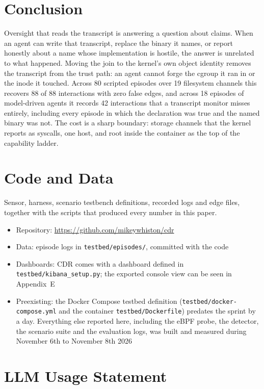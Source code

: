 \documentclass[11pt]{article}
\begin{document}
\section{Conclusion}

Oversight that reads the transcript is answering a question about claims. When an
agent can write that transcript, replace the binary it names, or report honestly
about a name whose implementation is hostile, the answer is unrelated to what
happened. Moving the join to the kernel's own object identity removes the transcript
from the trust path: an agent cannot forge the cgroup it ran in or the inode it
touched. Across 80 scripted episodes over 19 filesystem channels this recovers 88 of
88 interactions with zero false edges, and across 18 episodes of model-driven agents
it records 42 interactions that a transcript monitor misses entirely, including
every episode in which the declaration was true and the named binary was not. The
cost is a sharp boundary: storage channels that the kernel reports as syscalls, one
host, and root inside the container as the top of the capability ladder.

\section*{Code and Data}

Sensor, harness, scenario testbench definitions, recorded logs and edge files, together
with the scripts that produced every number in this paper.
\begin{itemize}\raggedright
\item Repository: \url{https://github.com/mikeywhiston/cdr}
\item Data: episode logs in \texttt{testbed/episodes/}, committed with the code
\item Dashboards: CDR comes with a dashboard defined in \texttt{testbed/kibana\_setup.py};
the exported console view can be seen in Appendix~E
\item Preexisting: the Docker Compose testbed definition
(\texttt{testbed/docker-compose.yml} and the container \texttt{testbed/Dockerfile})
predates the sprint by a day. Everything else reported here, including the eBPF probe,
the detector, the scenario suite and the evaluation logs, was built and measured during
November 6th to November 8th 2026
\end{itemize}

\section*{LLM Usage Statement}
\end{document}

